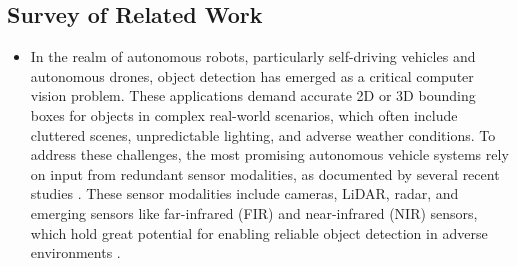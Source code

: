 \documentclass[rnd]{mas_proposal}
\begin{document}
\subsection{Survey of Related Work}
\begin{itemize}
      


      
      \item In the realm of autonomous robots, particularly self-driving vehicles and autonomous drones, object detection has emerged as a critical computer vision problem. These applications demand accurate 2D or 3D bounding boxes for objects in complex real-world scenarios, which often include cluttered scenes, unpredictable lighting, and adverse weather conditions. To address these challenges, the most promising autonomous vehicle systems rely on input from redundant sensor modalities, as documented by several recent studies \cite{caesar2020nuscenes, sun2020scalability, ziegler2014making}. These sensor modalities include cameras, LiDAR, radar, and emerging sensors like far-infrared (FIR) and near-infrared (NIR) sensors, which hold great potential for enabling reliable object detection in adverse environments \cite{bijelic2020seeing}.


\end{itemize}
\end{document}
